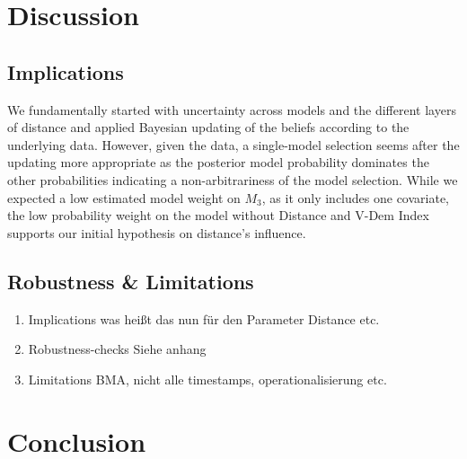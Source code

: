 \documentclass[12pt,a4paper]{article}
\begin{document}
\section{Discussion}
\subsection{Implications}
We fundamentally started with uncertainty across models and the different layers of distance and applied Bayesian updating of the beliefs according to the underlying data. However, given the data, a single-model selection seems after the updating more appropriate as the posterior model probability dominates the other probabilities indicating a non-arbitrariness of the model selection. While we expected a low estimated model weight on $M_3$, as it only includes one covariate, the low probability weight on the model without Distance and V-Dem Index supports our initial hypothesis on distance's influence. 




\subsection{Robustness \& Limitations}
\begin{enumerate}
\item Implications  was heißt das nun für den Parameter Distance etc. 
\item Robustness-checks  Siehe anhang
\item Limitations BMA, nicht alle timestamps, operationalisierung etc. 
\end{enumerate}
\clearpage
\section{Conclusion}
\end{document}
